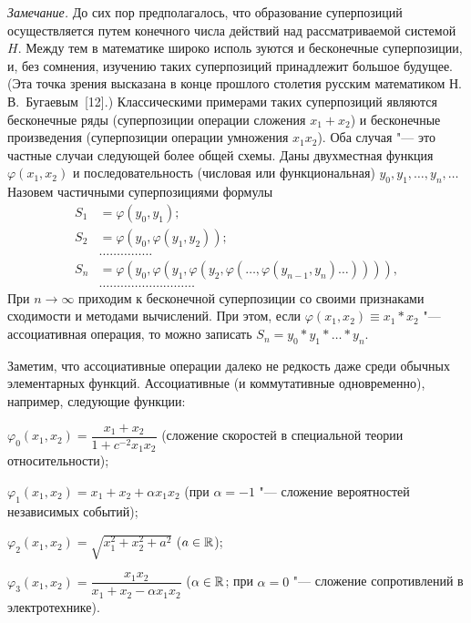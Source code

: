 \emph{Замечание.} До сих пор предполагалось, что образование суперпозиций
осуществляется путем конечного числа действий над рассматриваемой системой
$H$. Между тем в математике широко исполь\-%
%
зуются и бесконечные суперпозиции, и, без сомнения, изучению таких
суперпозиций принадлежит большое будущее. (Эта точка зрения высказана
в конце прошлого столетия русским математиком Н.\,В.~Бугаевым~[12].)
Классическими примерами таких суперпозиций являются бесконечные ряды
(суперпозиции операции сложения $x_1+x_2$) и бесконечные произведения
(суперпозиции операции умножения $x_1x_2$). Оба случая "--- это частные
случаи следующей более общей схемы. Даны двухместная функция
$\varphi(x_1,x_2)$ и последовательность (числовая или функциональная)
$y_0,y_1,\dots,y_n,\dots$ Назовем частичными суперпозициями формулы
\begin{equation}\tag{1.13}
\begin{aligned}
S_1&=\varphi(y_0,y_1);\\
S_2&=\varphi(y_0,\varphi(y_1,y_2));\\
&\dots\dots\dots\dots\dots\\
S_n&=\varphi(y_0,\varphi(y_1,\varphi(y_2,\varphi(\dots,\varphi(y_{n-1},y_n)\dots)))),\\
&\dots\dots\dots\dots\dots\dots\dots\dots\dots
\end{aligned}
\end{equation}
При $n\to\infty$ приходим к бесконечной суперпозиции со своими признаками
сходимости и методами вычислений. При этом, если
$\varphi(x_1,x_2)\equiv x_1*x_2$ "--- ассоциативная операция, то можно
записать $S_n=y_0*y_1*\dots*y_n$.

Заметим, что ассоциативные операции далеко не редкость даже среди обычных
элементарных функций. Ассоциативные (и коммутативные одновременно),
например, следующие функции:

$\varphi_0(x_1,x_2)=\dfrac{x_1+x_2}{1+c^{-2}x_1x_2}$ (сложение скоростей
в специальной теории относительности);

$\varphi_1(x_1,x_2)=x_1+x_2+\alpha x_1x_2$ (при $\alpha=-1$ "--- сложение
вероятностей независимых событий);

$\varphi_2(x_1,x_2)=\sqrt{x_1^2+x_2^2+a^2}$ ($a\in\mathbb R$);

$\varphi_3(x_1,x_2)=\dfrac{x_1x_2}{x_1+x_2-\alpha x_1x_2}$ ($\alpha\in\mathbb R$;
при $\alpha=0$ "--- сложение сопротивлений в электротехнике).

